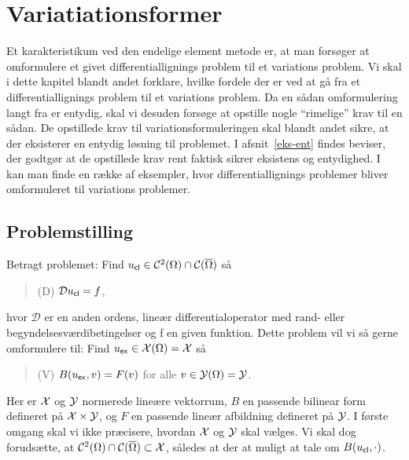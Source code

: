 \chapter{Variatiationsformer} \label{variation}
Et karakteristikum ved den endelige element metode er, at man forsøger
at omformulere et givet differentiallignings problem til et variations
problem. Vi skal i dette kapitel blandt andet forklare, hvilke fordele der er ved
at gå fra et differentiallignings problem til et variations problem.
Da en sådan omformulering langt fra er entydig, skal vi desuden
forsøge at opstille nogle ``rimelige'' krav til en sådan. De
opstillede krav til variationsformuleringen skal blandt andet sikre,
at der eksisterer en entydig løsning til problemet. I
afsnit~\ref{eks-ent} findes beviser, der godtgør at de opstillede
krav rent faktisk sikrer eksistens og entydighed. I~\cite{babuska82}
kan man finde en række af eksempler, hvor differentiallignings
problemer bliver omformuleret til variations problemer.

\section{Problemstilling}
Betragt problemet: Find $u_{\mathsf{cl}} \in {\mathcal{C}}^2(\Omega) \cap {\mathcal{C}}(\overline{\Omega})$ så
\begin{quote}
(D) \hspace{.2cm} ${\mathcal{D}} u_{\mathsf{cl}}=f$,
\end{quote}
hvor ${\mathcal{D}}$ er en anden ordens, lineær differentialoperator med rand- eller
be\-gyn\-del\-ses\-vær\-di\-be\-tin\-gel\-ser og f en given funktion. Dette problem vil
vi så gerne omformulere til: Find $u_{\mathsf{ex}} \in \mathcal{X}(\Omega)=\mathcal{X}$ så
\begin{quote}
(V) \hspace{.2cm} $B(u_{\mathsf{ex}},v)=F(v)$ for alle $v \in \mathcal{Y}(\Omega)=\mathcal{Y}$.
\end{quote}
Her er $\mathcal{X}$ og $\mathcal{Y}$ normerede lineære vektorrum, $B$ en passende bilinear form
defineret på $\mathcal{X} \times \mathcal{Y}$, og $F$ en passende lineær afbildning defineret på $\mathcal{Y}$.
I første omgang skal vi ikke præcisere, hvordan $\mathcal{X}$ og $\mathcal{Y}$ skal
vælges. Vi skal dog forudsætte, at ${\mathcal{C}}^2(\Omega) \cap {\mathcal{C}}(\overline{\Omega}) \subset \mathcal{X}$, således at
der at muligt at tale om $B(u_{\mathsf{cl}},\cdot)$.

